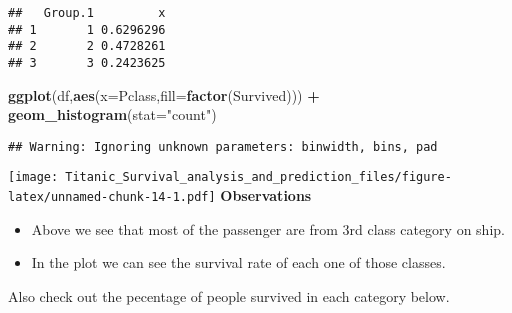 \documentclass[]{article}
\newenvironment{Shaded}{\begin{snugshade}}{\end{snugshade}}
\newcommand{\KeywordTok}[1]{\textcolor[rgb]{0.13,0.29,0.53}{\textbf{#1}}}
\newcommand{\DataTypeTok}[1]{\textcolor[rgb]{0.13,0.29,0.53}{#1}}
\newcommand{\DecValTok}[1]{\textcolor[rgb]{0.00,0.00,0.81}{#1}}
\newcommand{\StringTok}[1]{\textcolor[rgb]{0.31,0.60,0.02}{#1}}
\newcommand{\CommentTok}[1]{\textcolor[rgb]{0.56,0.35,0.01}{\textit{#1}}}
\newcommand{\OperatorTok}[1]{\textcolor[rgb]{0.81,0.36,0.00}{\textbf{#1}}}
\newcommand{\NormalTok}[1]{#1}
\providecommand{\tightlist}{%
  \setlength{\itemsep}{0pt}\setlength{\parskip}{0pt}}
\begin{document}
\begin{verbatim}
##   Group.1         x
## 1       1 0.6296296
## 2       2 0.4728261
## 3       3 0.2423625
\end{verbatim}

\begin{Shaded}
\begin{Highlighting}[]
\KeywordTok{ggplot}\NormalTok{(df,}\KeywordTok{aes}\NormalTok{(}\DataTypeTok{x=}\NormalTok{Pclass,}\DataTypeTok{fill=}\KeywordTok{factor}\NormalTok{(Survived))) }\OperatorTok{+}\StringTok{ }\KeywordTok{geom_histogram}\NormalTok{(}\DataTypeTok{stat=}\StringTok{"count"}\NormalTok{)}
\end{Highlighting}
\end{Shaded}

\begin{verbatim}
## Warning: Ignoring unknown parameters: binwidth, bins, pad
\end{verbatim}

\texttt{[image: Titanic\_Survival\_analysis\_and\_prediction\_files/figure-latex/unnamed-chunk-14-1.pdf]}
\textbf{Observations}

\begin{itemize}
\tightlist
\item
  Above we see that most of the passenger are from 3rd class category on
  ship.
\item
  In the plot we can see the survival rate of each one of those classes.
\end{itemize}

Also check out the pecentage of people survived in each category below.

\begin{Shaded}
\end{Shaded}
\end{document}
